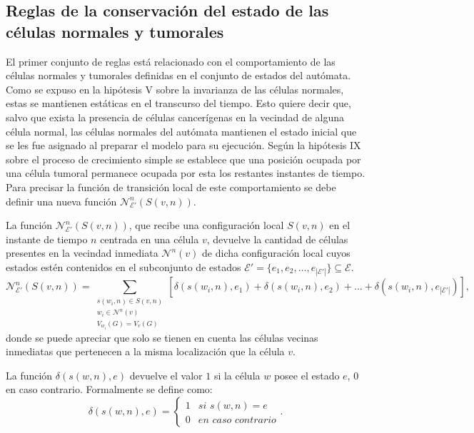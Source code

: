 \subsection{Reglas de la conservaci\'on del estado de las c\'elulas normales y tumorales}
\label{subsec-inert}
El primer conjunto de reglas est\'a relacionado con el comportamiento de las c\'elulas normales y tumorales definidas en el conjunto de estados del aut\'omata. Como se expuso en la hip\'otesis V sobre la invarianza de las c\'elulas normales, estas se mantienen est\'aticas en el transcurso del tiempo. Esto quiere decir que, salvo que exista la presencia de c\'elulas cancer\'igenas en la vecindad de alguna c\'elula normal, las c\'elulas normales del aut\'omata mantienen el estado inicial que se les fue asignado al preparar el modelo para su ejecuci\'on. Seg\'un la hip\'otesis IX sobre el proceso de crecimiento simple se establece que una posici\'on ocupada por una c\'elula tumoral permanece ocupada por esta los restantes instantes de tiempo. Para precisar la funci\'on de transici\'on local de este comportamiento se debe definir una nueva funci\'on $\mathcal{N}_{\mathcal{E'}}^n(S(v,n))$.

\begin{definition}
\label{def-near-neighbours}
La funci\'on $\mathcal{N}_{\mathcal{E'}}^n(S(v,n))$, que recibe una configuraci\'on local $S(v,n)$ en el instante de tiempo $n$ centrada en una c\'elula $v$, devuelve la cantidad de c\'elulas presentes en la vecindad inmediata $\mathcal{N}^{n}(v)$ de dicha configuraci\'on local cuyos estados est\'en contenidos en el subconjunto de estados $\mathcal{E'} = \lbrace e_1, e_2, \ldots , e_{|\mathcal{E'}|}\rbrace \subseteq \mathcal{E}$.
\begin{equation}
\mathcal{N}_{\mathcal{E'}}^n(S(v,n)) = \sum_{\substack{{s(w_i,n) \in S(v,n)}\\{w_i \in \mathcal{N}^{n}(v)}\\{V_{w_i}(G)=V_v(G)}}} \left[\delta(s(w_i,n),e_1) + \delta(s(w_i,n),e_2) + \ldots + \delta(s(w_i,n),e_{|\mathcal{E'}|}) \right], \label{eq-near-neighbours}
\end{equation}
donde se puede apreciar que solo se tienen en cuenta las c\'elulas vecinas inmediatas que pertenecen a la misma localizaci\'on que la c\'elula $v$. 
\end{definition}

\begin{definition}
\label{def-delta}
La funci\'on $\delta(s(w,n),e)$ devuelve el valor $1$ si la c\'elula $w$ posee el estado $e$, $0$ en caso contrario. Formalmente se define como:
\begin{equation}
\delta(s(w,n),e)=\left\lbrace
	\begin{array}{ll}
		1& \textit{si } s(w,n)=e \\
		0& \textit{en caso contrario}
	\end{array}
\right.. 
\end{equation}
\end{definition}

